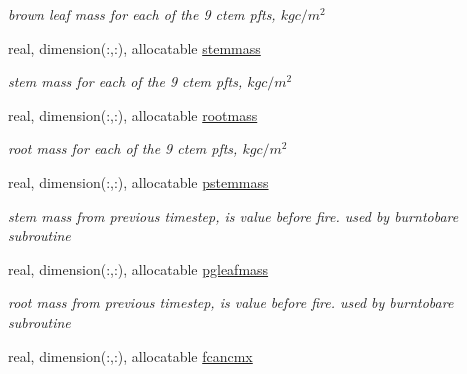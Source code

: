 \begin{DoxyCompactItemize}
\begin{DoxyCompactList}\small\item\em brown leaf mass for each of the 9 ctem pfts, $kg c/m^2$ \end{DoxyCompactList}\item 
\hypertarget{structctem__statevars_1_1veg__gat_a4cf22e19ec4bc215b27c608da8cb0d9e}{}real, dimension(\+:,\+:), allocatable \hyperlink{structctem__statevars_1_1veg__gat_a4cf22e19ec4bc215b27c608da8cb0d9e}{stemmass}\label{structctem__statevars_1_1veg__gat_a4cf22e19ec4bc215b27c608da8cb0d9e}

\begin{DoxyCompactList}\small\item\em stem mass for each of the 9 ctem pfts, $kg c/m^2$ \end{DoxyCompactList}\item 
\hypertarget{structctem__statevars_1_1veg__gat_adb6e33fa44a382d663a602046c0c9d4e}{}real, dimension(\+:,\+:), allocatable \hyperlink{structctem__statevars_1_1veg__gat_adb6e33fa44a382d663a602046c0c9d4e}{rootmass}\label{structctem__statevars_1_1veg__gat_adb6e33fa44a382d663a602046c0c9d4e}

\begin{DoxyCompactList}\small\item\em root mass for each of the 9 ctem pfts, $kg c/m^2$ \end{DoxyCompactList}\item 
\hypertarget{structctem__statevars_1_1veg__gat_a0ae762376124ff7672a145cead19f404}{}real, dimension(\+:,\+:), allocatable \hyperlink{structctem__statevars_1_1veg__gat_a0ae762376124ff7672a145cead19f404}{pstemmass}\label{structctem__statevars_1_1veg__gat_a0ae762376124ff7672a145cead19f404}

\begin{DoxyCompactList}\small\item\em stem mass from previous timestep, is value before fire. used by burntobare subroutine \end{DoxyCompactList}\item 
\hypertarget{structctem__statevars_1_1veg__gat_a19f24e06942e439d9a53aa1bd181335c}{}real, dimension(\+:,\+:), allocatable \hyperlink{structctem__statevars_1_1veg__gat_a19f24e06942e439d9a53aa1bd181335c}{pgleafmass}\label{structctem__statevars_1_1veg__gat_a19f24e06942e439d9a53aa1bd181335c}

\begin{DoxyCompactList}\small\item\em root mass from previous timestep, is value before fire. used by burntobare subroutine \end{DoxyCompactList}\item 
\hypertarget{structctem__statevars_1_1veg__gat_afdd9fd0f57241ca0b665c065977eace5}{}real, dimension(\+:,\+:), allocatable \hyperlink{structctem__statevars_1_1veg__gat_afdd9fd0f57241ca0b665c065977eace5}{fcancmx}\label{structctem__statevars_1_1veg__gat_afdd9fd0f57241ca0b665c065977eace5}


\end{DoxyCompactItemize}
